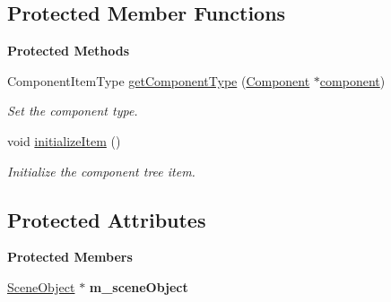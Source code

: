 \subsection*{Protected Member Functions}
\begin{Indent}\textbf{ Protected Methods}\par
\begin{DoxyCompactItemize}
\item 
\mbox{\label{classrev_1_1_view_1_1_component_item_a5d7f850e51ced5f45d72ff57daf65b71}} 
Component\+Item\+Type \mbox{\hyperlink{classrev_1_1_view_1_1_component_item_a5d7f850e51ced5f45d72ff57daf65b71}{get\+Component\+Type}} (\mbox{\hyperlink{classrev_1_1_component}{Component}} $\ast$\mbox{\hyperlink{classrev_1_1_view_1_1_component_item_a40d3b3bc333954297e9239d42e6b3b43}{component}})
\begin{DoxyCompactList}\small\item\em Set the component type. \end{DoxyCompactList}\item 
\mbox{\label{classrev_1_1_view_1_1_component_item_ad2d01127e546cf110555381e013c5a39}} 
void \mbox{\hyperlink{classrev_1_1_view_1_1_component_item_ad2d01127e546cf110555381e013c5a39}{initialize\+Item}} ()
\begin{DoxyCompactList}\small\item\em Initialize the component tree item. \end{DoxyCompactList}\end{DoxyCompactItemize}
\end{Indent}
\subsection*{Protected Attributes}
\begin{Indent}\textbf{ Protected Members}\par
\begin{DoxyCompactItemize}
\item 
\mbox{\label{classrev_1_1_view_1_1_component_item_afe2481c3d494ae79ee14882fe5b1abf1}} 
\mbox{\hyperlink{classrev_1_1_scene_object}{Scene\+Object}} $\ast$ {\bfseries m\+\_\+scene\+Object}
\end{DoxyCompactItemize}
\end{Indent}
